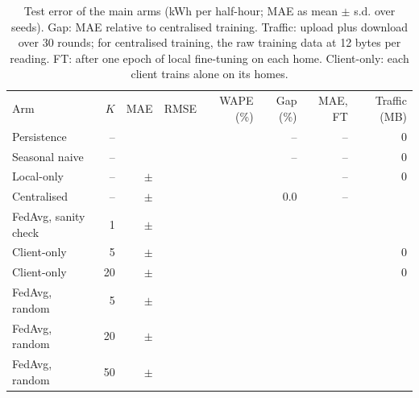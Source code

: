 \begin{table}
\caption{Test error of the main arms (kWh per half-hour; MAE as mean $\pm$ s.d. over seeds). Gap: MAE relative to
centralised training. Traffic: upload plus download over 30 rounds; for centralised training, the raw training data at
12 bytes per reading. FT: after one epoch of local fine-tuning on each home. Client-only: each client trains alone on
its homes.}\label{tab:main}
\begin{tabular}{lrrrrrrr}
Arm & $K$ & MAE & RMSE & WAPE (\%) & Gap (\%) & MAE, FT & Traffic (MB) \\
Persistence & -- & \PersistenceMAE{} & \PersistenceRMSE{} & \RvPersistenceWAPE{} & -- & -- & 0 \\
Seasonal naive & -- & \SeasonalNaiveMAE{} & \SeasonalNaiveRMSE{} & \RvSeasonalNaiveWAPE{} & -- & -- & 0 \\
Local-only & -- & \EonelocalMAE{} $\pm$ \EonelocalMAEsd{} & \EonelocalRMSE{} & \EonelocalWAPE{} & \EonelocalGap{} & -- & 0 \\
Centralised & -- & \EtwocentralizedMAE{} $\pm$ \EtwocentralizedMAEsd{} & \EtwocentralizedRMSE{} & \EtwocentralizedWAPE{} & 0.0 & -- & \EtwocentralizedMB{} \\
FedAvg, sanity check & 1 & \EonefourfedavgKoneMAE{} $\pm$ \EonefourfedavgKoneMAEsd{} & \EonefourfedavgKoneRMSE{} & \EonefourfedavgKoneWAPE{} & \EonefourfedavgKoneGap{} & \EonefourfedavgKoneFT{} & \EonefourfedavgKoneMB{} \\
Client-only & 5 & \RvCliFTKfiveMAE{} $\pm$ \RvCliFTKfiveMAEsd{} & \RvCliFTKfiveRMSE{} & \RvCliFTKfiveWAPE{} & \RvCliFTKfiveGap{} & \RvCliFTKfiveFT{} & 0 \\
Client-only & 20 & \RvCliFTKtwentyMAE{} $\pm$ \RvCliFTKtwentyMAEsd{} & \RvCliFTKtwentyRMSE{} & \RvCliFTKtwentyWAPE{} & \RvCliFTKtwentyGap{} & \RvCliFTKtwentyFT{} & 0 \\
FedAvg, random & 5 & \EonefourfedavgKfiveMAE{} $\pm$ \EonefourfedavgKfiveMAEsd{} & \EonefourfedavgKfiveRMSE{} & \EonefourfedavgKfiveWAPE{} & \EonefourfedavgKfiveGap{} & \EonefourfedavgKfiveFT{} & \EonefourfedavgKfiveMB{} \\
FedAvg, random & 20 & \EthreefedavgiidMAE{} $\pm$ \EthreefedavgiidMAEsd{} & \EthreefedavgiidRMSE{} & \EthreefedavgiidWAPE{} & \EthreefedavgiidGap{} & \EthreefedavgiidFT{} & \EthreefedavgiidMB{} \\
FedAvg, random & 50 & \EonefourfedavgKfivezeroMAE{} $\pm$ \EonefourfedavgKfivezeroMAEsd{} & \EonefourfedavgKfivezeroRMSE{} & \EonefourfedavgKfivezeroWAPE{} & \EonefourfedavgKfivezeroGap{} & \EonefourfedavgKfivezeroFT{} & \EonefourfedavgKfivezeroMB{} \\

\end{tabular}
\end{table}

